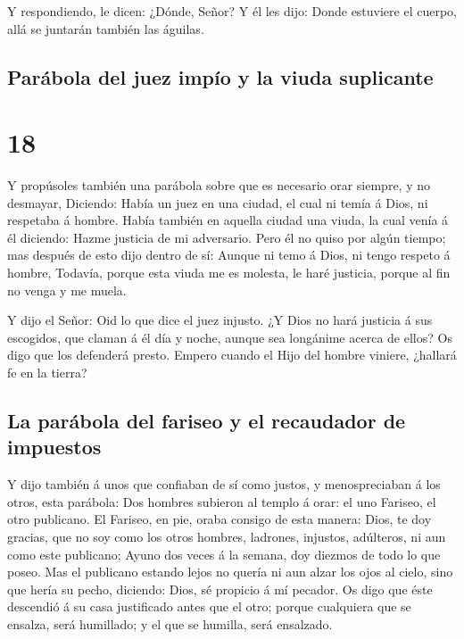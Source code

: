  Y respondiendo, le dicen: ¿Dónde, Señor? Y él les dijo:
Donde estuviere el cuerpo, allá se juntarán también las águilas.

\hypertarget{paruxe1bola-del-juez-impuxedo-y-la-viuda-suplicante}{%
\subsection{Parábola del juez impío y la viuda
suplicante}\label{paruxe1bola-del-juez-impuxedo-y-la-viuda-suplicante}}

\hypertarget{section-42-18}{%
\section{18}\label{section-42-18}}

 Y propúsoles también una parábola sobre que es necesario
orar siempre, y no desmayar,  Diciendo: Había un juez en
una ciudad, el cual ni temía á Dios, ni respetaba á hombre.
 Había también en aquella ciudad una viuda, la cual venía
á él diciendo: Hazme justicia de mi adversario.  Pero él
no quiso por algún tiempo; mas después de esto dijo dentro de sí: Aunque
ni temo á Dios, ni tengo respeto á hombre,  Todavía,
porque esta viuda me es molesta, le haré justicia, porque al fin no
venga y me muela.

 Y dijo el Señor: Oid lo que dice el juez injusto.
 ¿Y Dios no hará justicia á sus escogidos, que claman á él
día y noche, aunque sea longánime acerca de ellos?  Os
digo que los defenderá presto. Empero cuando el Hijo del hombre viniere,
¿hallará fe en la tierra?

\hypertarget{la-paruxe1bola-del-fariseo-y-el-recaudador-de-impuestos}{%
\subsection{La parábola del fariseo y el recaudador de
impuestos}\label{la-paruxe1bola-del-fariseo-y-el-recaudador-de-impuestos}}

 Y dijo también á unos que confiaban de sí como justos, y
menospreciaban á los otros, esta parábola:  Dos hombres
subieron al templo á orar: el uno Fariseo, el otro publicano.
 El Fariseo, en pie, oraba consigo de esta manera: Dios,
te doy gracias, que no soy como los otros hombres, ladrones, injustos,
adúlteros, ni aun como este publicano;  Ayuno dos veces á
la semana, doy diezmos de todo lo que poseo.  Mas el
publicano estando lejos no quería ni aun alzar los ojos al cielo, sino
que hería su pecho, diciendo: Dios, sé propicio á mí pecador.
 Os digo que éste descendió á su casa justificado antes
que el otro; porque cualquiera que se ensalza, será humillado; y el que
se humilla, será ensalzado.


